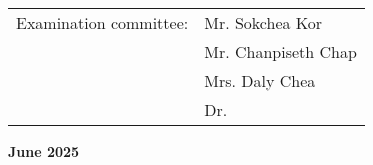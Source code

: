 \begin{titlepage}
    {\englishfont
    \begin{center}
        \begin{tabular}{ll}
            {Examination committee:} & Mr. Sokchea Kor \\
                                    & Mr. Chanpiseth Chap\\
                                    & Mrs. Daly Chea\\
                                    & Dr. \dotfill
        \end{tabular}
    \end{center}
    }

    \vfill
    {\englishfont\fontsize{20pt}{20pt}\Large\bfseries June 2025\par}
\end{titlepage}

